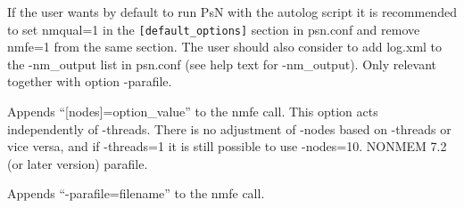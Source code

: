 \begin{optionlist}
If the user wants by default to run PsN with the autolog script it is recommended to set nmqual=1 in the 
\verb|[default_options]| section in psn.conf and remove nmfe=1 from the same section. The user should also consider to add log.xml to the -nm\_output list in psn.conf (see help text for -nm\_output).
\nextopt
{}
Only relevant together with option -parafile. 

Appends “[nodes]=option\_value” to the nmfe call. This option acts independently of -threads. There is no adjustment of -nodes based on -threads or vice versa, and if -threads=1 it is still possible to use -nodes=10. 
\nextopt
{}
NONMEM 7.2 (or later version) parafile.

Appends “-parafile=filename” to the nmfe call. 
\nextopt
\end{optionlist}
